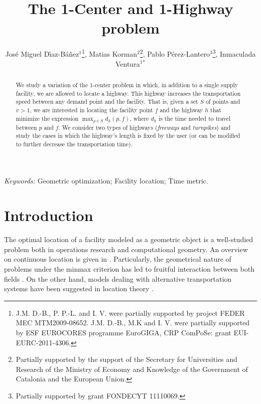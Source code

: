 \documentclass{llncs}
\begin{document}
\title{The 1-Center and 1-Highway problem}



\author{Jos\'{e} Miguel D\'{\i}az-B\'{a}\~{n}ez$^1$\fnmsep\thanks{J.M. D.-B., P. P.-L. and I. V. were partially supported by project FEDER MEC MTM2009-08652. J.M. D.-B., M.K and I. V. were partially supported by ESF EUROCORES programme EuroGIGA, CRP ComPoSe: grant EUI-EURC-2011-4306.},
Matias Korman$^2$\fnmsep\thanks{Partially supported by the support of the Secretary for Universities and Research of the Ministry of Economy and Knowledge of the Government of Catalonia and the European Union.},
Pablo P\'erez-Lantero$^{3}$\thanks{Partially supported by grant FONDECYT 11110069.},
Inmaculada Ventura$^{1}$\fnmsep$^*$}









\maketitle

\begin{abstract}
We study a variation of the $1$-center problem in which, in addition to a single supply facility, we are allowed to locate a highway. This highway increases the transportation speed between any demand point and the facility. That is, given a set $S$ of points and $v>1$, we are interested in locating the facility point $f$ and the highway $h$ that minimize the expression $\max_{p\in S}d_{h}(p,f)$, where $d_h$ is the time needed to travel between $p$ and $f$. We consider two types of highways ({\em freeways} and {\em turnpikes}) and study the cases in which the highway's length is fixed by the user (or can be modified to further decrease the transportation time).
\end{abstract}

\textit{Keywords:} Geometric optimization; Facility location; Time metric.

\section{Introduction}
The optimal location of a facility modeled as a geometric object is a well-studied problem both in operations research and computational geometry. An overview on continuous location is given in \cite{plastria}. Particularly, the geometrical nature of problems under the minmax criterion has led to fruitful interaction between both fields \cite{hamacher,godfried}. On the other hand, models dealing with alternative transportation systems have been suggested in location theory \cite{mesa}.
\end{document}
